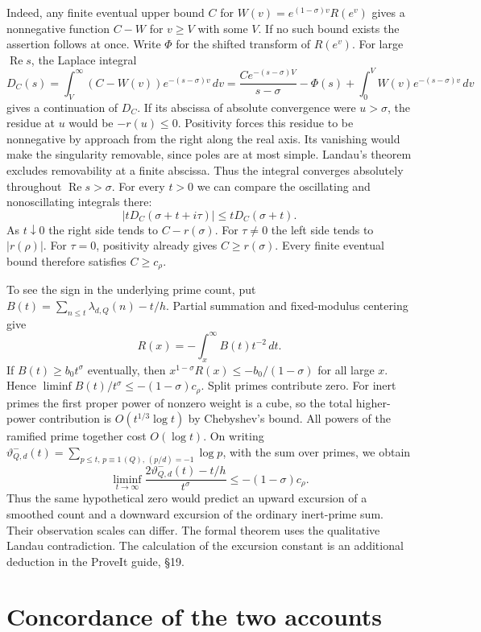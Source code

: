 Indeed, any finite eventual upper bound $C$ for $W(v)=e^{(1-\sigma)v}R(e^v)$ gives a nonnegative function $C-W$ for $v\ge V$ with some $V$. If no such bound exists the assertion follows at once. Write $\Phi$ for the shifted transform of $R(e^v)$. For large $\operatorname{Re}s$, the Laplace integral
\[
 D_C(s)=\int_V^\infty (C-W(v))e^{-(s-\sigma)v}\,dv
 = \frac{Ce^{-(s-\sigma)V}}{s-\sigma}-\Phi(s)
 +\int_0^V W(v)e^{-(s-\sigma)v}\,dv
\]
gives a continuation of $D_C$. If its abscissa of absolute convergence were $u>\sigma$, the residue at $u$ would be $-r(u)\le0$. Positivity forces this residue to be nonnegative by approach from the right along the real axis. Its vanishing would make the singularity removable, since poles are at most simple. Landau's theorem excludes removability at a finite abscissa. Thus the integral converges absolutely throughout $\operatorname{Re}s>\sigma$. For every $t>0$ we can compare the oscillating and nonoscillating integrals there:
\[
 |tD_C(\sigma+t+i\tau)|\le tD_C(\sigma+t).
\]
As $t\downarrow0$ the right side tends to $C-r(\sigma)$. For $\tau\ne0$ the left side tends to $|r(\rho)|$. For $\tau=0$, positivity already gives $C\ge r(\sigma)$. Every finite eventual bound therefore satisfies $C\ge c_\rho$.

To see the sign in the underlying prime count, put $B(t)=\sum_{n\le t}\lambda_{d,Q}(n)-t/h$. Partial summation and fixed-modulus centering give
\[
 R(x)=-\int_x^\infty B(t)t^{-2}\,dt.
\]
If $B(t)\ge b_0 t^\sigma$ eventually, then $x^{1-\sigma}R(x)\le-b_0/(1-\sigma)$ for all large $x$. Hence $\liminf B(t)/t^\sigma\le-(1-\sigma)c_\rho$. Split primes contribute zero. For inert primes the first proper power of nonzero weight is a cube, so the total higher-power contribution is $O(t^{1/3}\log t)$ by Chebyshev's bound. All powers of the ramified prime together cost $O(\log t)$. On writing $\vartheta^-_{Q,d}(t)=\sum_{p\le t,\,p\equiv1\, (Q),\,(p/d)=-1}\log p$, with the sum over primes, we obtain
\[
 \liminf_{t\to\infty}\frac{2\vartheta^-_{Q,d}(t)-t/h}{t^\sigma}
 \le -(1-\sigma)c_\rho .
\]
Thus the same hypothetical zero would predict an upward excursion of a smoothed count and a downward excursion of the ordinary inert-prime sum. Their observation scales can differ. The formal theorem uses the qualitative Landau contradiction. The calculation of the excursion constant is an additional deduction in the ProveIt guide, \S19.

\section{Concordance of the two accounts}\label{sec:concordance}

